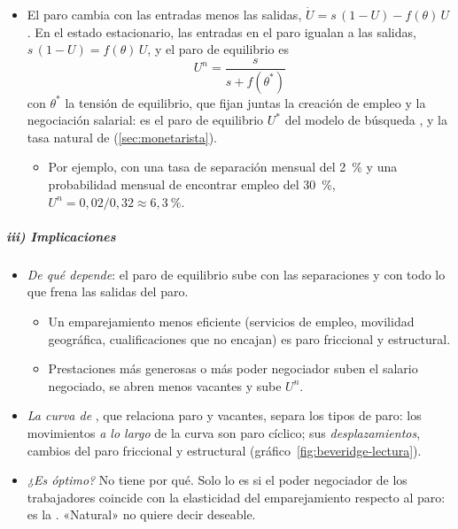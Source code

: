 \documentclass[11pt]{article}
\begin{document}
\begin{itemize}
\item El paro cambia con las entradas menos las salidas, $\dot U=s\,(1-U)-f(\theta)\,U$. En el estado estacionario, las entradas en el paro igualan a las salidas, $s\,(1-U)=f(\theta)\,U$, y el paro de equilibrio es
  \begin{equation}
  U^n=\frac{s}{s+f(\theta^*)} \label{eq:tasa-natural-flujos}
  \end{equation}
  con $\theta^*$ la tensión de equilibrio, que fijan juntas la creación de empleo y la negociación salarial: es el paro de equilibrio $U^*$ del modelo de búsqueda , y la tasa natural de  (\ref{sec:monetarista}).
  \begin{itemize}
  \item Por ejemplo, con una tasa de separación mensual del 2~\% y una probabilidad mensual de encontrar empleo del 30~\%, $U^n=0{,}02/0{,}32\approx6{,}3~\%$.
  \end{itemize}
\end{itemize}

\subparagraph{iii) Implicaciones}

\begin{itemize}
\item \emph{De qué depende}: el paro de equilibrio sube con las separaciones y con todo lo que frena las salidas del paro.
  \begin{itemize}
  \item Un emparejamiento menos eficiente (servicios de empleo, movilidad geográfica, cualificaciones que no encajan) es paro friccional y estructural.
  \item Prestaciones más generosas o más poder negociador suben el salario negociado, se abren menos vacantes y sube $U^n$.
  \end{itemize}
\item \emph{La curva de }, que relaciona paro y vacantes, separa los tipos de paro: los movimientos \emph{a lo largo} de la curva son paro cíclico; sus \emph{desplazamientos}, cambios del paro friccional y estructural (gráfico~\ref{fig:beveridge-lectura}).
\item \emph{¿Es óptimo?} No tiene por qué. Solo lo es si el poder negociador de los trabajadores coincide con la elasticidad del emparejamiento respecto al paro: es la \nocite{Hosios1990Efficiency} . «Natural» no quiere decir deseable.
\end{itemize}
\end{document}
